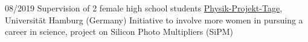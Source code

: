 	\position
      {08/2019} 
      {Supervision of 2 female high school students}
      {\href{https://www.ppt.uni-hamburg.de}{Physik-Projekt-Tage}, Universit\"{a}t Hamburg (Germany)}
      {Initiative to involve more women in pursuing a career in science, project on Silicon Photo Multipliers (SiPM)}
